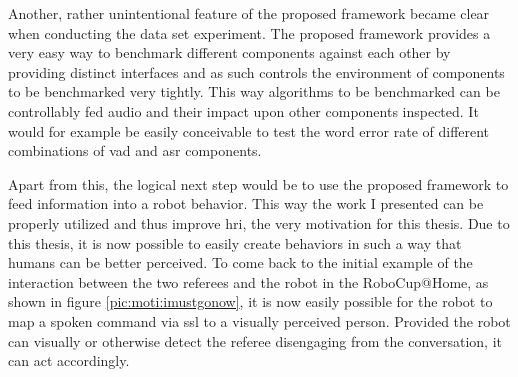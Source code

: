 Another, rather unintentional feature of the proposed framework became clear when conducting the data set experiment.
The proposed framework provides a very easy way to benchmark different components against each other by providing distinct interfaces and as such controls the environment of components to be benchmarked very tightly.
This way algorithms to be benchmarked can be controllably fed audio and their impact upon other components inspected.
It would for example be easily conceivable to test the word error rate of different combinations of \gls{vad} and \gls{asr} components.

Apart from this, the logical next step would be to use the proposed framework to feed information into a robot behavior.
This way the work I presented can be properly utilized and thus improve \gls{hri}, the very motivation for this thesis.
Due to this thesis, it is now possible to easily create behaviors in such a way that humans can be better perceived.
To come back to the initial example of the interaction between the two referees and the robot in the RoboCup@Home, as shown in figure \ref{pic:moti:imustgonow}, it is now easily possible for the robot to map a spoken command via \gls{ssl} to a visually perceived person.
Provided the robot can visually or otherwise detect the referee disengaging from the conversation, it can act accordingly.


